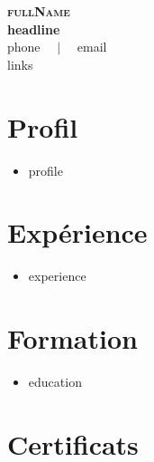\documentclass[10pt,a4paper]{article}
\begin{document}
\begin{center}
    \textbf{\Huge \scshape \color{navy} {{fullName}}} \\[3pt]
    \small \textbf{\color{accent} {{headline}}} \\[3pt]
    \footnotesize \color{greytext}
    {{phone}} $\quad|\quad$
    {{email}} \\[2pt]
    {{links}}
\end{center}

\vspace{4pt}

\section{Profil}
\begin{itemize}[
  leftmargin=0.18in,
  label={},
  itemsep=1.2pt,
  topsep=2pt,
  parsep=0pt
]
\small
\item {{profile}}
\end{itemize}

\vspace{-2pt}

\section{Expérience}

\begin{itemize}[
  leftmargin=0.18in,
  label={},
  itemsep=1.2pt,
  topsep=2pt,
  parsep=0pt
]
\small
\item {{experience}}
\end{itemize}

\vspace{-2pt}

\section{Formation}

\begin{itemize}[
  leftmargin=0.18in,
  label={},
  itemsep=1.2pt,
  topsep=2pt,
  parsep=0pt
]
\small
\item {{education}}
\end{itemize}

\vspace{-2pt}

\section{Certificats}
\end{document}
